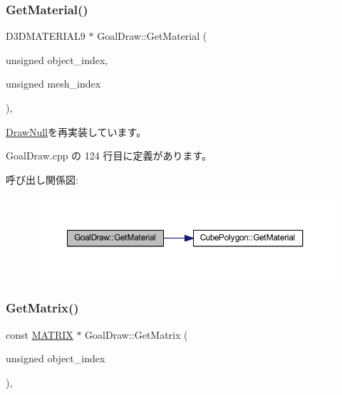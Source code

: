 \subsubsection{\texorpdfstring{Get\+Material()}{GetMaterial()}}
{\footnotesize\ttfamily D3\+D\+M\+A\+T\+E\+R\+I\+A\+L9 $\ast$ Goal\+Draw\+::\+Get\+Material (\begin{DoxyParamCaption}\item[{unsigned}]{object\+\_\+index,  }\item[{unsigned}]{mesh\+\_\+index }\end{DoxyParamCaption})\hspace{0.3cm}{\ttfamily [override]}, {\ttfamily [virtual]}}



\mbox{\hyperlink{class_draw_null_a84969d22d3436986f214e9896fe44fc6}{Draw\+Null}}を再実装しています。



 Goal\+Draw.\+cpp の 124 行目に定義があります。

呼び出し関係図\+:\nopagebreak
\begin{figure}[H]
\begin{center}
\leavevmode
\includegraphics[width=350pt]{class_goal_draw_a47baf72f8c1c961176610f161069b8d1_cgraph}
\end{center}
\end{figure}
\mbox{\label{class_goal_draw_a50fa9ceaaecdff9910e0f91e65ad9e95}} 
\subsubsection{\texorpdfstring{Get\+Matrix()}{GetMatrix()}}
{\footnotesize\ttfamily const \mbox{\hyperlink{_vector3_d_8h_a032295cd9fb1b711757c90667278e744}{M\+A\+T\+R\+IX}} $\ast$ Goal\+Draw\+::\+Get\+Matrix (\begin{DoxyParamCaption}\item[{unsigned}]{object\+\_\+index }\end{DoxyParamCaption})\hspace{0.3cm}{\ttfamily [override]}, {\ttfamily [virtual]}}



